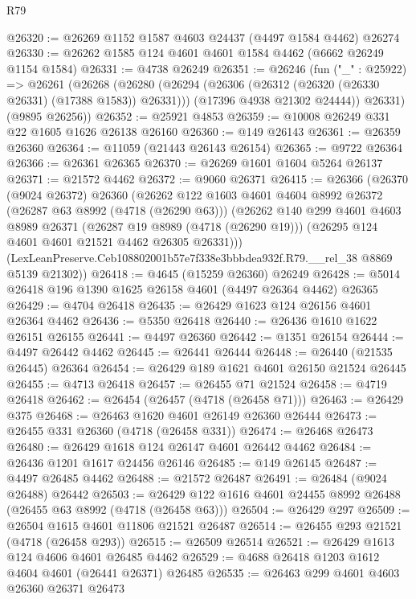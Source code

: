 \begin{lexlean}{R79}
\begin{coremodule}
@26320 := @26269 @1152 @1587 @4603 @24437 (@4497 @1584 @4462) @26274
@26330 := @26262 @1585 @124 @4601 @4601 @1584 @4462 (@6662 @26249 @1154 @1584)
@26331 := @4738 @26249
@26351 := @26246
    (fun ("_" : @25922) =>
    @26261
      (@26268
        (@26280
          (@26294 (@26306 (@26312 (@26320 (@26330 @26331) (@17388 @1583)) @26331)))
          (@17396 @4938 @21302 @24444))
        @26331)
      (@9895 @26256))
@26352 := @25921 @4853
@26359 := @10008 @26249 @331 @22 @1605 @1626 @26138 @26160
@26360 := @149 @26143
@26361 := @26359 @26360
@26364 := @11059 (@21443 @26143 @26154)
@26365 := @9722 @26364
@26366 := @26361 @26365
@26370 := @26269 @1601 @1604 @5264 @26137
@26371 := @21572 @4462
@26372 := @9060 @26371
@26415 := @26366
    (@26370
      (@9024 @26372)
      @26360
      (@26262
        @122
        @1603
        @4601
        @4604
        @8992
        @26372
        (@26287 @63 @8992 (@4718 (@26290 @63)))
        (@26262
          @140
          @299
          @4601
          @4603
          @8989
          @26371
          (@26287 @19 @8989 (@4718 (@26290 @19)))
          (@26295 @124 @4601 @4601 @21521 @4462 @26305 @26331)))
      (LexLeanPreserve.Ceb108802001b57e7f338e3bbbdea932f.R79.__rel_38 @8869 @5139 @21302))
@26418 := @4645 (@15259 @26360) @26249
@26428 := @5014 @26418 @196 @1390 @1625 @26158 @4601 (@4497 @26364 @4462) @26365
@26429 := @4704 @26418
@26435 := @26429 @1623 @124 @26156 @4601 @26364 @4462
@26436 := @5350 @26418
@26440 := @26436 @1610 @1622 @26151 @26155
@26441 := @4497 @26360
@26442 := @1351 @26154
@26444 := @4497 @26442 @4462
@26445 := @26441 @26444
@26448 := @26440 (@21535 @26445) @26364
@26454 := @26429 @189 @1621 @4601 @26150 @21524 @26445
@26455 := @4713 @26418
@26457 := @26455 @71 @21524
@26458 := @4719 @26418
@26462 := @26454 (@26457 (@4718 (@26458 @71)))
@26463 := @26429 @375
@26468 := @26463 @1620 @4601 @26149 @26360 @26444
@26473 := @26455 @331 @26360 (@4718 (@26458 @331))
@26474 := @26468 @26473
@26480 := @26429 @1618 @124 @26147 @4601 @26442 @4462
@26484 := @26436 @1201 @1617 @24456 @26146
@26485 := @149 @26145
@26487 := @4497 @26485 @4462
@26488 := @21572 @26487
@26491 := @26484 (@9024 @26488) @26442
@26503 := @26429 @122 @1616 @4601 @24455 @8992 @26488 (@26455 @63 @8992 (@4718 (@26458 @63)))
@26504 := @26429 @297
@26509 := @26504 @1615 @4601 @11806 @21521 @26487
@26514 := @26455 @293 @21521 (@4718 (@26458 @293))
@26515 := @26509 @26514
@26521 := @26429 @1613 @124 @4606 @4601 @26485 @4462
@26529 := @4688 @26418 @1203 @1612 @4604 @4601 (@26441 @26371) @26485
@26535 := @26463 @299 @4601 @4603 @26360 @26371 @26473

\end{coremodule}
\end{lexlean}
